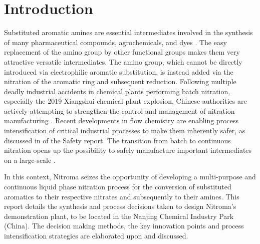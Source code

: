 \section{Introduction} %

Substituted aromatic amines are essential intermediates involved in the synthesis of many pharmaceutical compounds, agrochemicals, and dyes \cite{vogt_amines_2000}. The easy replacement of the amino group by other functional groups makes them very attractive versatile intermediates. The amino group, which cannot be directly introduced via electrophilic aromatic substitution, is instead added via the nitration of the aromatic ring and subsequent reduction.
Following multiple deadly industrial accidents in chemical plants performing batch nitration, especially the 2019 Xiangshui chemical plant explosion, Chinese authorities are actively attempting to strengthen the control and management of nitration manufacturing \cite{el_diario_china_2019}.
Recent developments in flow chemistry are enabling process intensification of critical industrial processes to make them inherently safer, as discussed in  of the Safety report. The transition from batch to continuous nitration opens up the possibility to safely manufacture important intermediates on a large-scale \cite{di_miceli_raimondi_safety_2015}.

In this context, Nitroma seizes the opportunity of developing a multi-purpose and continuous liquid phase nitration process for the conversion of substituted aromatics to their respective nitrates and subsequently to their amines. 
This report details the synthesis and process decisions taken to design Nitroma’s demonstration plant, to be located in the Nanjing Chemical Industry Park (China). The decision making methods, the key innovation points and process intensification strategies are elaborated upon and discussed.
